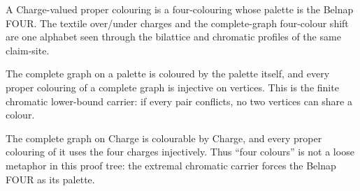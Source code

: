 \begin{proposition}\label{thm:four-colour-palette-is-four}\leanok{}
A Charge-valued proper colouring is a four-colouring whose palette is the
Belnap FOUR.  The textile over/under charges and the complete-graph
four-colour shift are one alphabet seen through the bilattice and chromatic
profiles of the same claim-site.
\end{proposition}

\begin{theorem}\label{thm:complete-graph-forces-distinct-colours}\leanok{}
The complete graph on a palette is coloured by the palette itself, and every
proper colouring of a complete graph is injective on vertices.  This is the
finite chromatic lower-bound carrier: if every pair conflicts, no two vertices
can share a colour.
\end{theorem}

\begin{theorem}\label{thm:k4-requires-four-charges}\leanok{}
The complete graph on Charge is colourable by Charge, and every proper
colouring of it uses the four charges injectively.  Thus ``four colours'' is
not a loose metaphor in this proof tree: the extremal chromatic carrier forces
the Belnap FOUR as its palette.
\end{theorem}
